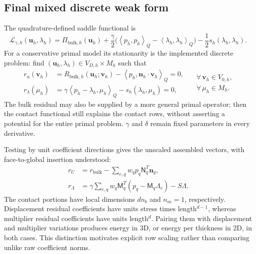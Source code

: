 \documentclass[preprint,11pt]{elsarticle}
\numberwithin{equation}{section}
\newcommand{\bu}{\boldsymbol{u}}
\newcommand{\bv}{\boldsymbol{v}}
\newcommand{\bn}{\boldsymbol{n}}
\newcommand{\iq}[2]{\left\langle #1,#2\right\rangle_Q}
\begin{document}
\subsection{Final mixed discrete weak form}
The quadrature-defined saddle functional is
\begin{equation}
 \mathcal L_{\gamma,h}(\bu_h,\lambda_h)=\Pi_{\mathrm{bulk},h}(\bu_h)
 +\frac\gamma2\bigl(\iq{p_h}{p_h}-\iq{\lambda_h}{\lambda_h}\bigr)
 -\frac12s_h(\lambda_h,\lambda_h).
 \label{eq:discretefunctional}
\end{equation}
For a conservative primal model its stationarity is the implemented
discrete problem: find $(\bu_h,\lambda_h)\in V_{D,h}\times M_h$ such that
\begin{equation}
 \boxed{\begin{aligned}
 r_u(\bv_h)&=R_{\mathrm{bulk},h}(\bu_h;\bv_h)
                   -\iq{p_h}{\bn_h\cdot\bv_h}=0,\\
 r_\lambda(\mu_h)&=\gamma\iq{p_h-\lambda_h}{\mu_h}
                   -s_h(\lambda_h,\mu_h)=0,
 \end{aligned}\quad
 \begin{gathered}
   \forall\,\bv_h\in V_{0,h},\\
   \forall\,\mu_h\in M_h.
 \end{gathered}}
 \label{eq:finalweak}
\end{equation}
The bulk residual may also be supplied by a more general primal operator;
then the contact functional still explains the contact rows, without
asserting a potential for the entire primal problem. $\gamma$ and
$\delta$ remain fixed parameters in every derivative.

Testing by unit coefficient directions gives the unscaled assembled
vectors, with face-to-global insertion understood:
\begin{align}
 r_U&=r_{\mathrm{bulk}}-\sum_{e,q}w_qp_q\mathsf N_q^T\bn_q,
 \label{eq:vectorru}\\
 r_\Lambda&=\gamma\sum_{e,q}w_q\mathsf M_q^T
                          (p_q-\mathsf M_q\Lambda_e)-S\Lambda.
 \label{eq:vectorrl}
\end{align}
The contact portions have local dimensions $dn_b$ and $n_m=1$,
respectively. Displacement residual coefficients have units
stress times length$^{d-1}$, whereas multiplier residual coefficients
have units length$^d$. Pairing them with displacement and multiplier
variations produces energy in 3D, or energy per thickness in 2D, in both
cases. This distinction motivates explicit row scaling rather than
comparing unlike raw coefficient norms.
\end{document}
